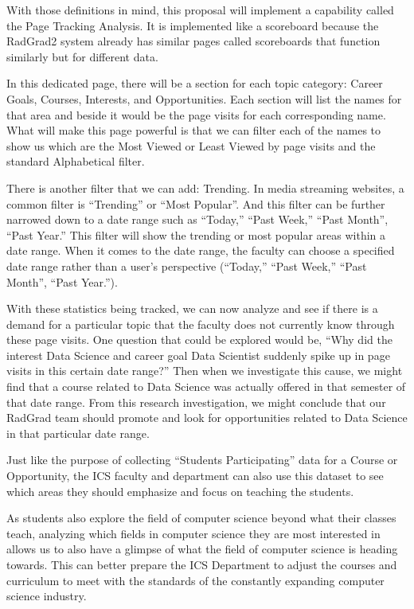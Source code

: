 \documentclass[english]{proposalnsf}
\begin{document}
  With those definitions in mind, this proposal will implement a capability called the Page Tracking Analysis. It is
  implemented like a scoreboard because the RadGrad2 system already has similar pages called scoreboards that function
  similarly but for different data.

  In this dedicated page, there will be a section for each topic category: Career Goals, Courses, Interests, and
  Opportunities. Each section will list the names for that area and beside it would be the page visits for each
  corresponding name. What will make this page powerful is that we can filter each of the names to show us which are
  the Most Viewed or Least Viewed by page visits and the standard Alphabetical filter.

  There is another filter that we can add: Trending. In media streaming websites, a common filter is ``Trending'' or
  ``Most Popular''. And this filter can be further narrowed down to a date range such as ``Today,''
  ``Past Week,'' ``Past Month'', ``Past Year.'' This filter will show the trending or most popular areas within a date
  range. When it comes to the date range, the faculty can choose a specified date range rather than a user's
  perspective (``Today,'' ``Past Week,'' ``Past Month'', ``Past Year.'').

  With these statistics being tracked, we can now analyze and see if there is a demand for a particular topic that the
  faculty does not currently know through these page visits. One question that could be explored would be, ``Why did
  the interest Data Science and career goal Data Scientist suddenly spike up in page visits in this certain
  date range?'' Then when we investigate this cause, we might find that a course related to Data Science was actually
  offered in that semester of that date range. From this research investigation, we might conclude that our RadGrad
  team should promote and look for opportunities related to Data Science in that particular date range.

  Just like the purpose of collecting ``Students Participating'' data for a Course or Opportunity, the ICS faculty and
  department can also use this dataset to see which areas they should emphasize and focus on teaching the students.

  As students also explore the field of computer science beyond what their classes teach, analyzing which fields in
  computer science they are most interested in allows us to also have a glimpse of what the field of computer science
  is heading towards. This can better prepare the ICS Department to adjust the courses and curriculum to meet with the
  standards of the constantly expanding computer science industry.
\end{document}
